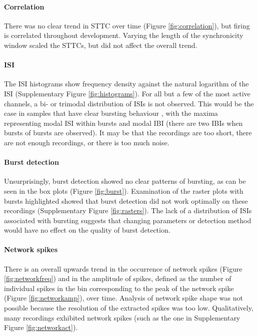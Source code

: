 \documentclass[10pt]{article}
\begin{document}
\paragraph{Correlation} There was no clear trend in STTC over time (Figure \ref{fig:correlation}), but firing is correlated throughout development. Varying the length of the synchronicity window scaled the STTCs, but did not affect the overall trend.

\paragraph{ISI} The ISI histograms show frequency density against the natural logarithm of the ISI (Supplementary Figure \ref{fig:histograms}). For all but a few of the most active channels, a bi- or trimodal distribution of ISIs is not observed. This would be the case in samples that have clear bursting behaviour \cite{charlesworth_quantitative_2015}, with the maxima representing modal ISI within bursts and modal IBI (there are two IBIs when bursts of bursts are observed). It may be that the recordings are too short, there are not enough recordings, or there is too much noise.

\paragraph{Burst detection} Unsurprisingly, burst detection showed no clear patterns of bursting, as can be seen in the box plots (Figure \ref{fig:burst}). Examination of the raster plots with bursts highlighted showed that burst detection did not work optimally on these recordings (Supplementary Figure \ref{fig:rasters}). The lack of a distribution of ISIs associated with bursting suggests that changing parameters or detection method would have no effect on the quality of burst detection.

\paragraph{Network spikes} There is an overall upwards trend in the occurrence of network spikes (Figure \ref{fig:networkfreq}) and in the amplitude of spikes, defined as the number of individual spikes in the bin corresponding to the peak of the network spike (Figure \ref{fig:networkamp}), over time. Analysis of network spike shape was not possible because the resolution of the extracted spikes was too low. Qualitatively, many recordings exhibited network spikes (such as the one in Supplementary Figure \ref{fig:networkact}).
\end{document}
